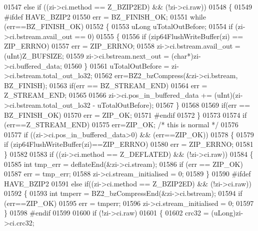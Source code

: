 \begin{DoxyCode}
01547     \textcolor{keywordflow}{else} \textcolor{keywordflow}{if} ((zi->ci.method == Z\_BZIP2ED) && (!zi->ci.raw))
01548     \{
01549 \textcolor{preprocessor}{#ifdef HAVE\_BZIP2}
01550       err = BZ\_FINISH\_OK;
01551       \textcolor{keywordflow}{while} (err==BZ\_FINISH\_OK)
01552       \{
01553         uLong uTotalOutBefore;
01554         \textcolor{keywordflow}{if} (zi->ci.bstream.avail\_out == 0)
01555         \{
01556           \textcolor{keywordflow}{if} (zip64FlushWriteBuffer(zi) == ZIP\_ERRNO)
01557             err = ZIP\_ERRNO;
01558           zi->ci.bstream.avail\_out = (uInt)Z\_BUFSIZE;
01559           zi->ci.bstream.next\_out = (\textcolor{keywordtype}{char}*)zi->ci.buffered\_data;
01560         \}
01561         uTotalOutBefore = zi->ci.bstream.total\_out\_lo32;
01562         err=BZ2\_bzCompress(&zi->ci.bstream,  BZ\_FINISH);
01563         \textcolor{keywordflow}{if}(err == BZ\_STREAM\_END)
01564           err = Z\_STREAM\_END;
01565 
01566         zi->ci.pos\_in\_buffered\_data += (uInt)(zi->ci.bstream.total\_out\_lo32 - uTotalOutBefore);
01567       \}
01568 
01569       \textcolor{keywordflow}{if}(err == BZ\_FINISH\_OK)
01570         err = ZIP\_OK;
01571 \textcolor{preprocessor}{#endif}
01572     \}
01573 
01574     \textcolor{keywordflow}{if} (err==Z\_STREAM\_END)
01575         err=ZIP\_OK; \textcolor{comment}{/* this is normal */}
01576 
01577     \textcolor{keywordflow}{if} ((zi->ci.pos\_in\_buffered\_data>0) && (err==ZIP\_OK))
01578                 \{
01579         \textcolor{keywordflow}{if} (zip64FlushWriteBuffer(zi)==ZIP\_ERRNO)
01580             err = ZIP\_ERRNO;
01581                 \}
01582 
01583     \textcolor{keywordflow}{if} ((zi->ci.method == Z\_DEFLATED) && (!zi->ci.raw))
01584     \{
01585         \textcolor{keywordtype}{int} tmp\_err = deflateEnd(&zi->ci.stream);
01586         \textcolor{keywordflow}{if} (err == ZIP\_OK)
01587             err = tmp\_err;
01588         zi->ci.stream\_initialised = 0;
01589     \}
01590 \textcolor{preprocessor}{#ifdef HAVE\_BZIP2}
01591     \textcolor{keywordflow}{else} \textcolor{keywordflow}{if}((zi->ci.method == Z\_BZIP2ED) && (!zi->ci.raw))
01592     \{
01593       \textcolor{keywordtype}{int} tmperr = BZ2\_bzCompressEnd(&zi->ci.bstream);
01594                         \textcolor{keywordflow}{if} (err==ZIP\_OK)
01595                                 err = tmperr;
01596                         zi->ci.stream\_initialised = 0;
01597     \}
01598 \textcolor{preprocessor}{#endif}
01599 
01600     \textcolor{keywordflow}{if} (!zi->ci.raw)
01601     \{
01602         crc32 = (uLong)zi->ci.crc32;

\end{DoxyCode}
